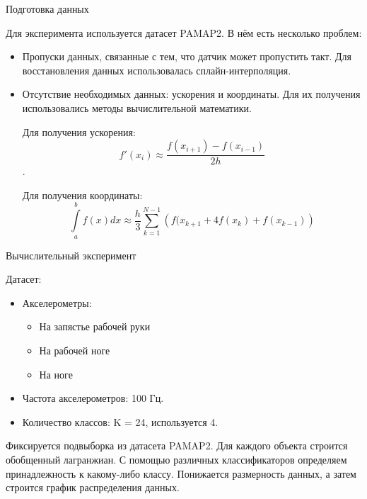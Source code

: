 \documentclass{beamer}
\begin{document}
\begin{frame}{Подготовка данных}

    Для эксперимента используется датасет PAMAP2. В нём есть несколько проблем:
        \begin{itemize}
    
            \item Пропуски данных, связанные с тем, что датчик может пропустить такт. Для восстановления данных использовалась сплайн-интерполяция.

            \item Отсутствие необходимых данных: ускорения и координаты. Для их получения использовались методы вычислительной математики.

            Для получения ускорения:
            $$f'(x_i) \approx \frac{f(x_{i + 1}) - f(x_{i - 1})}{2h}$$.

            Для получения координаты:
            $$\int\limits_a^b f(x) dx \approx \frac{h}{3} \sum\limits_{k = 1}^{N - 1} \left( f(x_{k + 1} + 4f(x_k) + f(x_{k - 1}) \right)$$

        \end{itemize}

\end{frame}


\begin{frame}{Вычислительный эксперимент}

    Датасет:
        \begin{itemize}

            \item Акселерометры:
                    \begin{itemize}

                        \item На запястье рабочей руки

                        \item На рабочей ноге

                        \item На ноге

                    \end{itemize}

            \item Частота акселерометров: 100 Гц.
            
            \item Количество классов: K = 24, используется 4.

        \end{itemize}
        
Фиксируется подвыборка из датасета PAMAP2. Для каждого объекта строится обобщенный лагранжиан. С помощью различных классификаторов определяем принадлежность к какому-либо классу.
Понижается размерность данных, а затем строится график распределения данных.

\end{frame}
\end{document}
